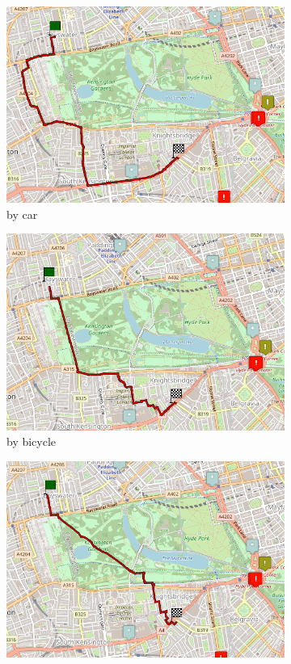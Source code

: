 \begin{figure}[H]
	\centering
	\begin{subfigure}[b]{0.3\textwidth}
		\centering
		\includegraphics[width=\textwidth]{assets/routing_car.png}
		\caption{by car}
	\end{subfigure}
	\hfill
	\begin{subfigure}[b]{0.3\textwidth}
		\centering
		\includegraphics[width=\textwidth]{assets/routing_bike.png}
		\caption{by bicycle}
	\end{subfigure}
	\hfill
	\begin{subfigure}[b]{0.3\textwidth}
		\centering
		\includegraphics[width=\textwidth]{assets/routing_foot.png}

\end{subfigure}
\end{figure}

